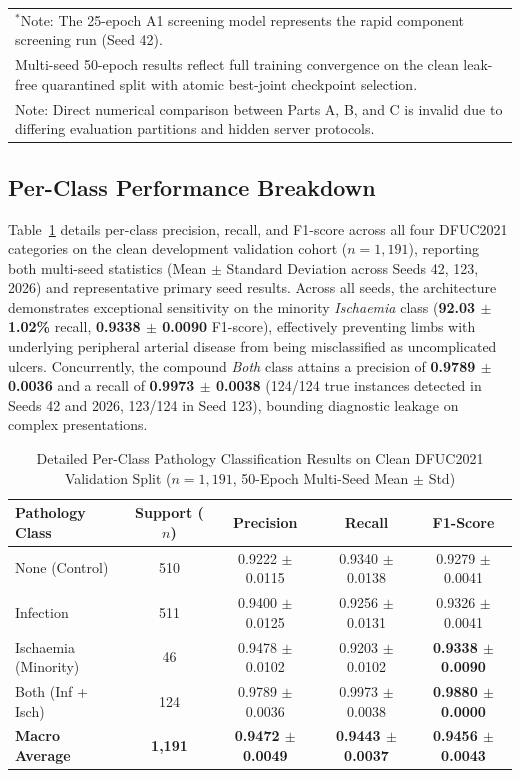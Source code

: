 \documentclass[journal]{IEEEtran}
\begin{document}
\begin{table}[t]
\begin{tabular}{lllccccc}
\bottomrule
\multicolumn{8}{l}{\footnotesize $^*$Note: The 25-epoch A1 screening model represents the rapid component screening run (Seed 42).} \\
\multicolumn{8}{l}{\footnotesize Multi-seed 50-epoch results reflect full training convergence on the clean leak-free quarantined split with atomic best-joint checkpoint selection.} \\
\multicolumn{8}{l}{\footnotesize Note: Direct numerical comparison between Parts A, B, and C is invalid due to differing evaluation partitions and hidden server protocols.} \\
\end{tabular}
\end{table}

\subsection{Per-Class Performance Breakdown}
Table~\ref{tab:per_class} details per-class precision, recall, and F1-score across all four DFUC2021 categories on the clean development validation cohort ($n = 1,191$), reporting both multi-seed statistics (Mean $\pm$ Standard Deviation across Seeds 42, 123, 2026) and representative primary seed results. Across all seeds, the architecture demonstrates exceptional sensitivity on the minority \textit{Ischaemia} class (\textbf{92.03 $\pm$ 1.02\%} recall, \textbf{0.9338 $\pm$ 0.0090} F1-score), effectively preventing limbs with underlying peripheral arterial disease from being misclassified as uncomplicated ulcers. Concurrently, the compound \textit{Both} class attains a precision of \textbf{0.9789 $\pm$ 0.0036} and a recall of \textbf{0.9973 $\pm$ 0.0038} (124/124 true instances detected in Seeds 42 and 2026, 123/124 in Seed 123), bounding diagnostic leakage on complex presentations.

\begin{table}[h]
\centering
\caption{Detailed Per-Class Pathology Classification Results on Clean DFUC2021 Validation Split ($n=1,191$, 50-Epoch Multi-Seed Mean $\pm$ Std)}
\label{tab:per_class}
\begin{tabular}{lcccc}
\toprule
\textbf{Pathology Class} & \textbf{Support ($n$)} & \textbf{Precision} & \textbf{Recall} & \textbf{F1-Score} \\
\midrule
None (Control) & 510 & 0.9222 $\pm$ 0.0115 & 0.9340 $\pm$ 0.0138 & 0.9279 $\pm$ 0.0041 \\
Infection & 511 & 0.9400 $\pm$ 0.0125 & 0.9256 $\pm$ 0.0131 & 0.9326 $\pm$ 0.0041 \\
Ischaemia (Minority) & 46 & 0.9478 $\pm$ 0.0102 & 0.9203 $\pm$ 0.0102 & \textbf{0.9338 $\pm$ 0.0090} \\
Both (Inf + Isch) & 124 & 0.9789 $\pm$ 0.0036 & 0.9973 $\pm$ 0.0038 & \textbf{0.9880 $\pm$ 0.0000} \\
\midrule
\textbf{Macro Average} & \textbf{1,191} & \textbf{0.9472 $\pm$ 0.0049} & \textbf{0.9443 $\pm$ 0.0037} & \textbf{0.9456 $\pm$ 0.0043} \\
\bottomrule
\end{tabular}
\end{table}
\end{document}
